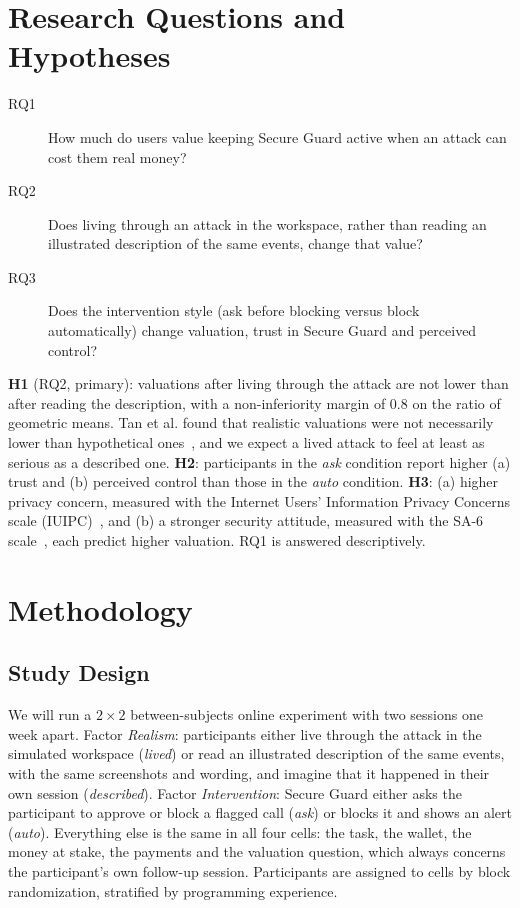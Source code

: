 \documentclass[sigconf,nonacm]{acmart}
\begin{document}
\section{Research Questions and Hypotheses}
\begin{description}
\item[RQ1] How much do users value keeping Secure Guard active when an attack can cost them real money?
\item[RQ2] Does living through an attack in the workspace, rather than reading an illustrated description of the same events, change that value?
\item[RQ3] Does the intervention style (ask before blocking versus block automatically) change valuation, trust in Secure Guard and perceived control?
\end{description}
\textbf{H1} (RQ2, primary): valuations after living through the attack are not lower than after reading the description, with a non-inferiority margin of 0.8 on the ratio of geometric means. Tan et al. found that realistic valuations were not necessarily lower than hypothetical ones~\cite{tan2018}, and we expect a lived attack to feel at least as serious as a described one. \textbf{H2}: participants in the \emph{ask} condition report higher (a) trust and (b) perceived control than those in the \emph{auto} condition. \textbf{H3}: (a) higher privacy concern, measured with the Internet Users' Information Privacy Concerns scale (IUIPC)~\cite{iuipc}, and (b) a stronger security attitude, measured with the SA-6 scale~\cite{sa6}, each predict higher valuation. RQ1 is answered descriptively.

\section{Methodology}

\subsection{Study Design}\label{sec:design}
We will run a $2\times2$ between-subjects online experiment with two sessions one week apart. Factor \emph{Realism}: participants either live through the attack in the simulated workspace (\emph{lived}) or read an illustrated description of the same events, with the same screenshots and wording, and imagine that it happened in their own session (\emph{described}). Factor \emph{Intervention}: Secure Guard either asks the participant to approve or block a flagged call (\emph{ask}) or blocks it and shows an alert (\emph{auto}). Everything else is the same in all four cells: the task, the wallet, the money at stake, the payments and the valuation question, which always concerns the participant's own follow-up session. Participants are assigned to cells by block randomization, stratified by programming experience.
\end{document}
